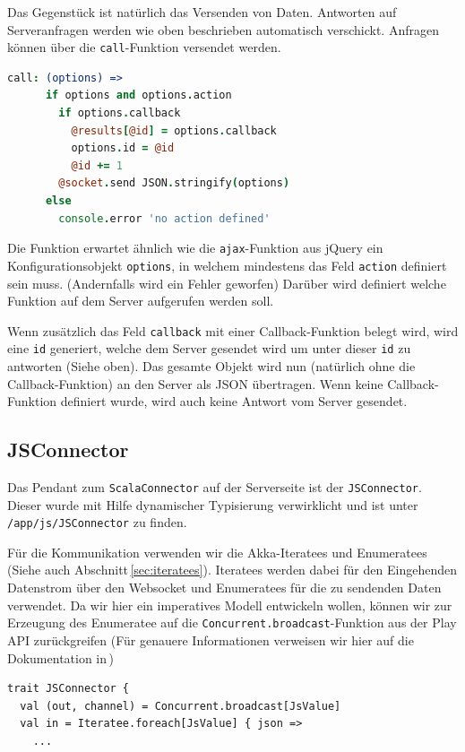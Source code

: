 Das Gegenstück ist natürlich das Versenden von Daten. Antworten auf Serveranfragen werden wie oben
beschrieben automatisch verschickt. Anfragen können über die \texttt{call}-Funktion versendet
werden.

\begin{lstlisting}[language=coffee] 
    call: (options) =>      
      if options and options.action        
        if options.callback
          @results[@id] = options.callback
          options.id = @id
          @id += 1
        @socket.send JSON.stringify(options)
      else
        console.error 'no action defined'
\end{lstlisting}

Die Funktion erwartet ähnlich wie die \texttt{ajax}-Funktion aus jQuery ein Konfigurationsobjekt
\texttt{options}, in welchem mindestens das Feld \texttt{action} definiert sein muss. (Andernfalls
wird ein Fehler geworfen) Darüber wird definiert welche Funktion auf dem Server aufgerufen werden
soll.

Wenn zusätzlich das Feld \texttt{callback} mit einer Callback-Funktion belegt wird, wird eine
\texttt{id} generiert, welche dem Server gesendet wird um unter dieser \texttt{id} zu antworten
(Siehe oben). Das gesamte Objekt wird nun (natürlich ohne die Callback-Funktion) an den Server als
JSON übertragen. Wenn keine Callback-Funktion definiert wurde, wird auch keine Antwort vom Server
gesendet.

\subsection{JSConnector}

Das Pendant zum \texttt{ScalaConnector} auf der Serverseite ist der \texttt{JSConnector}. Dieser
wurde mit Hilfe dynamischer Typisierung verwirklicht und ist unter \texttt{/app/js/JSConnector} zu
finden.

Für die Kommunikation verwenden wir die Akka-Iteratees und Enumeratees (Siehe auch
Abschnitt\,\ref{sec:iteratees}). Iteratees werden dabei für den Eingehenden Datenstrom über den
Websocket und Enumeratees für die zu sendenden Daten verwendet. Da wir hier ein imperatives Modell
entwickeln wollen, können wir zur Erzeugung des Enumeratee auf die
\texttt{Concurrent.broadcast}-Funktion aus der Play API zurückgreifen (Für genauere Informationen
verweisen wir hier auf die Dokumentation in\,\cite{play})

\begin{lstlisting}
trait JSConnector {
  val (out, channel) = Concurrent.broadcast[JsValue]
  val in = Iteratee.foreach[JsValue] { json =>
    ...
\end{lstlisting}

